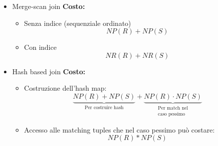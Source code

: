 \documentclass[a4paper,twoside]{article}
\begin{document}
\begin{enumerate}
\begin{itemize}
\begin{itemize}
          \item Con indice:
            \[
              NP(R) + NR(R) \cdot \left( ProfonditaIndice + \frac{NR(S)}{VAL(A,S)} \right) 
            \]
        \end{itemize}

      \item Merge-scan join \textbf{Costo: }
        \begin{itemize}
          \item Senza indice (sequenziale ordinato)
            \[
              NP(R) + NP(S)
            \] 

          \item Con indice
            \[
              NR(R) + NR(S)
            \] 
        \end{itemize}

      \item Hash based join \textbf{Costo: }
        \begin{itemize}
          \item Costruzione dell'hash map:
            \[
              \underbrace{NP(R) + NP(S)}_{\text{Per costruire hash}}
              +
              \underbrace{NP(R) \cdot NP(S)}_{\substack{\text{Per match nel}\\\text{caso pessimo}}}
            \] 

          \item Accesso alle matching tuples che nel caso pessimo può costare:
            \[
              NP(R) * NP(S)
            \]
        \end{itemize}
    \end{itemize}
\end{enumerate}
\end{document}
